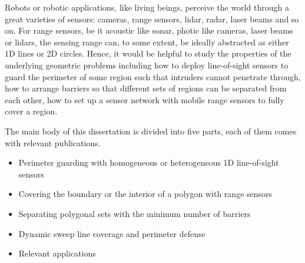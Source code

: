 \begin{my_abstract}

Robots or robotic applications, like living beings, perceive the world through
a great varieties of sensors: cameras, range sensors, lidar, radar, laser beams and so on.
For range sensors, be it acoustic like sonar, photic like cameras, laser beams or lidars, 
the sensing range can, to some extent, be ideally abstracted as either 1D lines or 2D circles.
Hence, it would be helpful to study the properties of the underlying geometric problems including 
how to deploy line-of-sight sensors to guard the perimeter of some region such that intruders cannot penetrate through, 
how to arrange barriers so that different sets of regions can be separated from each other,
how to set up a sensor network with mobile range sensors to fully cover a region. 

The main body of this dissertation is divided into five parts, each of them comes with relevant publications. 
\begin{itemize}
    \item Perimeter guarding with homogeneous or heterogeneous 1D line-of-sight sensors
    \item Covering the boundary or the interior of a polygon with range sensors
    \item Separating polygonal sets with the minimum number of barriers
    \item Dynamic sweep line coverage and perimeter defense
    \item Relevant applications
\end{itemize}

\end{my_abstract}
